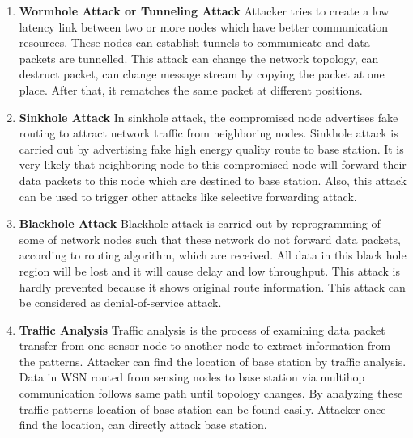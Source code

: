 \begin{enumerate}[label=\textbf{\roman*.}]
    \item \textbf{Wormhole Attack or Tunneling Attack} \cite{singh2014survey} Attacker tries to create a low latency link between two or more nodes which have better communication resources. These nodes can establish tunnels to communicate and data packets are tunnelled. This attack can change the network topology, can destruct packet, can change message stream by copying the packet at one place. After that, it rematches the same packet at different positions.
    
    \item \textbf{Sinkhole Attack }\cite{salehi2013detection} In sinkhole attack, the compromised node advertises fake routing to attract network traffic from neighboring nodes. Sinkhole attack is carried out by advertising fake high energy quality route to base station. It is very likely that neighboring node to this compromised node will forward their data packets to this node which are destined to base station. Also, this attack can be used to trigger other attacks like selective forwarding attack. 

    \item \textbf{Blackhole Attack }\cite{wazid2013detection} Blackhole attack is carried out by reprogramming of some of network nodes such that these network do not forward data packets, according to routing algorithm, which are received. All data in this black hole region will be lost and it will cause delay and low throughput. This attack is hardly prevented because it shows original route information. This attack can be considered as denial-of-service attack.
    
    
    \item \textbf{Traffic Analysis }\cite{deng2005countermeasures} Traffic analysis is the process of examining data packet transfer from one sensor node to another node to extract information from the patterns. Attacker can find the location of base station by traffic analysis. Data in WSN routed from sensing nodes to base station via multihop communication follows same path until topology changes. By analyzing these traffic patterns location of base station can be found easily. Attacker once find the location, can directly attack base station.
    

\end{enumerate}
